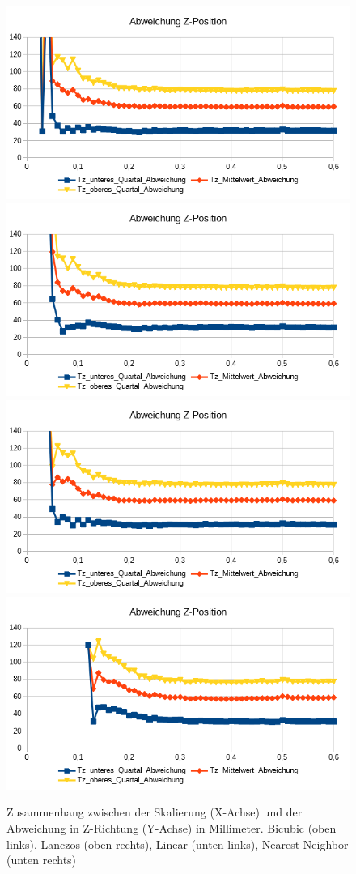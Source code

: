 \begin{figure}
	\centering
	\includegraphics[width=0.45\linewidth]{tabelle2/Z_Pos_Cubic}
	\includegraphics[width=0.45\linewidth]{tabelle2/Z_Pos_Lanc}
	\includegraphics[width=0.45\linewidth]{tabelle2/Z_Pos_Linear}
	\includegraphics[width=0.45\linewidth]{tabelle2/Z_Pos_NN}
	\caption{Zusammenhang zwischen der Skalierung (X-Achse) und der Abweichung in Z-Richtung (Y-Achse) in Millimeter. 
		Bicubic (oben links), Lanczos (oben rechts), Linear (unten links), Nearest-Neighbor (unten rechts)}
	\label{img_Z_Pos_Skal}
\end{figure}

